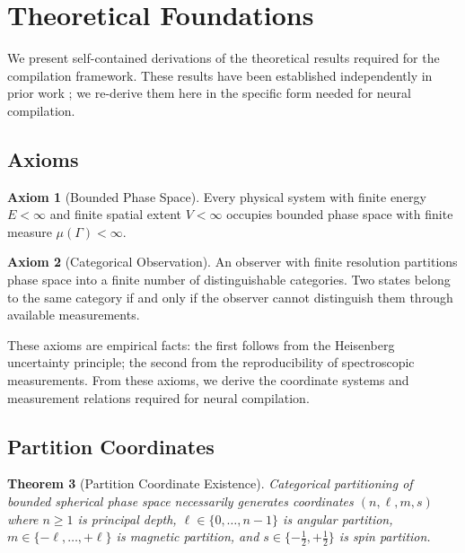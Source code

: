 \documentclass[11pt,twocolumn,a4paper]{article}
\newtheorem{theorem}{Theorem}[section]
\theoremstyle{definition}
\newtheorem{axiom}[theorem]{Axiom}
\theoremstyle{remark}
\begin{document}
\section{Theoretical Foundations}
\label{sec:foundations}

We present self-contained derivations of the theoretical results required for the compilation framework. These results have been established independently in prior work \cite{oxygen2024, partition2024, rpi2024, multimodal2024}; we re-derive them here in the specific form needed for neural compilation.

\subsection{Axioms}

\begin{axiom}[Bounded Phase Space]
\label{ax:bounded}
Every physical system with finite energy $E < \infty$ and finite spatial extent $V < \infty$ occupies bounded phase space with finite measure $\mu(\Gamma) < \infty$.
\end{axiom}

\begin{axiom}[Categorical Observation]
\label{ax:categorical}
An observer with finite resolution partitions phase space into a finite number of distinguishable categories. Two states belong to the same category if and only if the observer cannot distinguish them through available measurements.
\end{axiom}

These axioms are empirical facts: the first follows from the Heisenberg uncertainty principle; the second from the reproducibility of spectroscopic measurements. From these axioms, we derive the coordinate systems and measurement relations required for neural compilation.

\subsection{Partition Coordinates}

\begin{theorem}[Partition Coordinate Existence]
\label{thm:partition_coords}
Categorical partitioning of bounded spherical phase space necessarily generates coordinates $(n, \ell, m, s)$ where $n \geq 1$ is principal depth, $\ell \in \{0, \ldots, n-1\}$ is angular partition, $m \in \{-\ell, \ldots, +\ell\}$ is magnetic partition, and $s \in \{-\frac{1}{2}, +\frac{1}{2}\}$ is spin partition.
\end{theorem}
\end{document}

